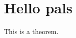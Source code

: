 \documentclass[reqno]{amsart} 
\begin{document}
\section{Hello pals}


\begin{theorem}\label{theorem:d1bd91cb750b}
This is a theorem.
\end{theorem}

{} 
\end{document}
